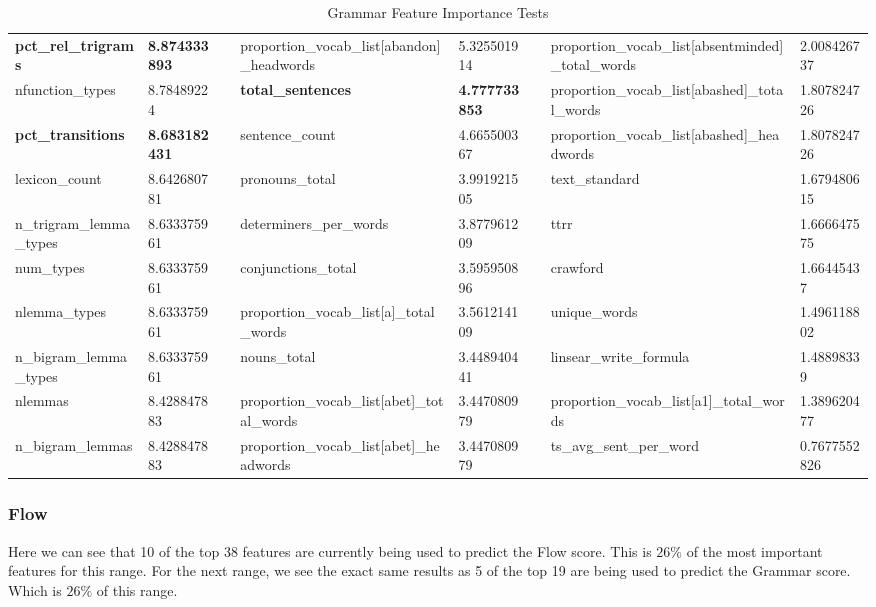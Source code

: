 \begin{table}[h]
{\begin{tabular}{@{}llllllll@{}}
\cellcolor[HTML]{EFEFEF}\textbf{pct\_rel\_trigrams} &
  \cellcolor[HTML]{EFEFEF}\textbf{8.874333893} &
  &
  proportion\_vocab\_list{[}abandon{]}\_headwords &
  5.325501914 &
  &
  proportion\_vocab\_list{[}absentminded{]}\_total\_words &
  2.008426737 \\
nfunction\_types &
  8.78489224 &
  &
  \cellcolor[HTML]{EFEFEF}\textbf{total\_sentences} &
  \cellcolor[HTML]{EFEFEF}\textbf{4.777733853} &
  &
  proportion\_vocab\_list{[}abashed{]}\_total\_words &
  1.807824726 \\
\cellcolor[HTML]{EFEFEF}\textbf{pct\_transitions} &
  \cellcolor[HTML]{EFEFEF}\textbf{8.683182431} &
  &
  sentence\_count &
  4.665500367 &
  &
  proportion\_vocab\_list{[}abashed{]}\_headwords &
  1.807824726 \\
lexicon\_count &
  8.642680781 &
  &
  pronouns\_total &
  3.991921505 &
  &
  text\_standard &
  1.679480615 \\
n\_trigram\_lemma\_types &
  8.633375961 &
  &
  determiners\_per\_words &
  3.877961209 &
  &
  ttrr &
  1.666647575 \\
num\_types &
  8.633375961 &
  &
  conjunctions\_total &
  3.595950896 &
  &
  crawford &
  1.66445437 \\
nlemma\_types &
  8.633375961 &
  &
  proportion\_vocab\_list{[}a{]}\_total\_words &
  3.561214109 &
  &
  unique\_words &
  1.496118802 \\
n\_bigram\_lemma\_types &
  8.633375961 &
  &
  nouns\_total &
  3.448940441 &
  &
  linsear\_write\_formula &
  1.48898339 \\
nlemmas &
  8.428847883 &
  &
  proportion\_vocab\_list{[}abet{]}\_total\_words &
  3.447080979 &
  &
  proportion\_vocab\_list{[}a1{]}\_total\_words &
  1.389620477 \\
n\_bigram\_lemmas &
  8.428847883 &
  &
  proportion\_vocab\_list{[}abet{]}\_headwords &
  3.447080979 &
  &
  ts\_avg\_sent\_per\_word &
  0.7677552826 \\ \bottomrule
\end{tabular}%
}
\caption{Grammar Feature Importance Tests}
\label{tab:e3}
\end{table}

\subsubsection{Flow}

Here we can see that 10 of the top 38 features are currently being used to predict the Flow score. This is $26\%$ of the most important features for this range. For the next range, we see the exact same results as 5 of the top 19 are being used to predict the Grammar score. Which is $26\%$ of this range.

